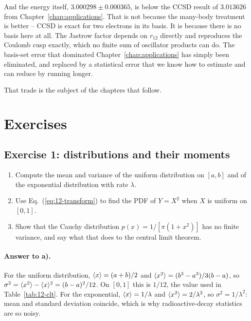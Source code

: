 And the energy itself, $3.000298\pm0.000365$, is below the CCSD result of
$3.013626$ from Chapter~\ref{chap:applications}.  That is not because the
many-body treatment is better -- CCSD is exact for two electrons in its basis.
It is because there is no basis here at all.  The Jastrow factor depends on
$r_{12}$ directly and reproduces the Coulomb cusp exactly, which no finite sum
of oscillator products can do.  The basis-set error that dominated
Chapter~\ref{chap:applications} has simply been eliminated, and replaced by a
statistical error that we know how to estimate and can reduce by running
longer.

That trade is the subject of the chapters that follow.

\section{Exercises}

\subsection*{Exercise 1: distributions and their moments}
\label{ex:12-moments}

\begin{enumerate}
  \item[a)] Compute the mean and variance of the uniform distribution on
  $[a,b]$ and of the exponential distribution with rate $\lambda$.
  \item[b)] Use Eq.~(\ref{eq:12-transform}) to find the PDF of $Y=X^2$ when
  $X$ is uniform on $[0,1]$.
  \item[c)] Show that the Cauchy distribution
  $p(x)=1/[\pi(1+x^2)]$ has no finite variance, and say what that does to the
  central limit theorem.
\end{enumerate}

\paragraph{Answer to a).}
For the uniform distribution, $\langle x \rangle=(a+b)/2$ and
$\langle x^2 \rangle=(b^3-a^3)/3(b-a)$, so
$\sigma^2=\langle x^2 \rangle-\langle x \rangle^2=(b-a)^2/12$.  On $[0,1]$ this is $1/12$, the
value used in Table~\ref{tab:12-clt}.  For the exponential,
$\langle x \rangle=1/\lambda$ and $\langle x^2 \rangle=2/\lambda^2$, so $\sigma^2=1/\lambda^2$:
mean and standard deviation coincide, which is why radioactive-decay
statistics are so noisy.

